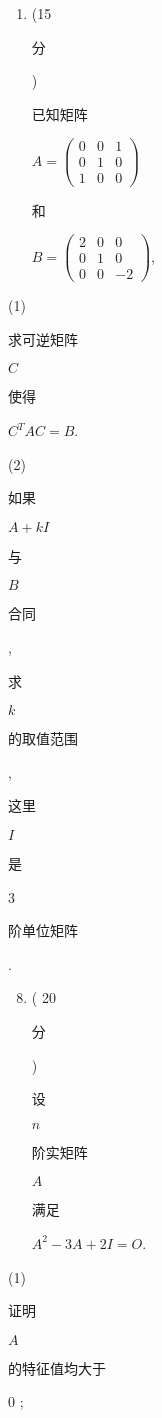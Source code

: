 \documentclass[10pt]{article}
\begin{document}
\begin{enumerate}
  \item (15 \begin{CJK}{UTF8}{mj}分\end{CJK}) \begin{CJK}{UTF8}{mj}已知矩阵\end{CJK} $A=\left(\begin{array}{ccc}0 & 0 & 1 \\ 0 & 1 & 0 \\ 1 & 0 & 0\end{array}\right)$ \begin{CJK}{UTF8}{mj}和\end{CJK} $B=\left(\begin{array}{ccc}2 & 0 & 0 \\ 0 & 1 & 0 \\ 0 & 0 & -2\end{array}\right)$,

\end{enumerate}
(1) \begin{CJK}{UTF8}{mj}求可逆矩阵\end{CJK} $C$ \begin{CJK}{UTF8}{mj}使得\end{CJK} $C^{T} A C=B$.

(2) \begin{CJK}{UTF8}{mj}如果\end{CJK} $A+k I$ \begin{CJK}{UTF8}{mj}与\end{CJK} $B$ \begin{CJK}{UTF8}{mj}合同\end{CJK}, \begin{CJK}{UTF8}{mj}求\end{CJK} $k$ \begin{CJK}{UTF8}{mj}的取值范围\end{CJK}, \begin{CJK}{UTF8}{mj}这里\end{CJK} $I$ \begin{CJK}{UTF8}{mj}是\end{CJK} 3 \begin{CJK}{UTF8}{mj}阶单位矩阵\end{CJK}.

\begin{enumerate}
  \setcounter{enumi}{7}
  \item ( 20 \begin{CJK}{UTF8}{mj}分\end{CJK}) \begin{CJK}{UTF8}{mj}设\end{CJK} $n$ \begin{CJK}{UTF8}{mj}阶实矩阵\end{CJK} $A$ \begin{CJK}{UTF8}{mj}满足\end{CJK} $A^{2}-3 A+2 I=O$.
\end{enumerate}
(1) \begin{CJK}{UTF8}{mj}证明\end{CJK} $A$ \begin{CJK}{UTF8}{mj}的特征值均大于\end{CJK} 0 ;
\end{document}
